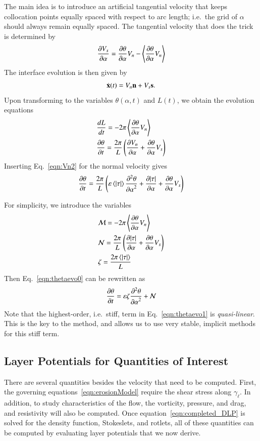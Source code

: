\documentclass[preprint, 10pt]{elsarticle}
\begin{document}
The main idea is to introduce an artificial tangential velocity that keeps collocation points equally spaced with respect to arc length; i.e.~the grid of $\alpha$ should always remain equally spaced. The tangential velocity that does the trick is determined by \cite{hou-low-she1994}
\begin{equation}
\frac{\partial V_s}{\partial \alpha} = \frac{\partial \theta}{\partial \alpha} V_n - \left< \frac{\partial \theta}{\partial \alpha} V_n \right>
\end{equation}
The interface evolution is then given by
\begin{equation}
\dot{{\mathbf{x}}}(t) = V_n {\mathbf{n}} + V_s {\mathbf{s}}.
\end{equation}
Upon transforming to the variables $\theta(\alpha,t)$ and $L(t)$, we obtain the evolution equations
\begin{align}
\label{eqn:Levo0}
& \frac{d L}{d t} = - 2 \pi \left< \frac{\partial \theta}{\partial \alpha} V_n \right> \\
\label{eqn:thetaevo0}
& \frac{\partial \theta}{\partial t} = \frac{2 \pi}{L} \left( \frac{\partial V_n}{\partial \alpha} + \frac{\partial \theta}{\partial \alpha} V_s \right)
\end{align}
Inserting Eq.~\eqref{eqn:Vn2} for the normal velocity gives
\begin{equation}
\frac{\partial \theta}{\partial t} = \frac{2\pi}{L} \left(
\varepsilon \left< \lvert \tau \rvert \right> \frac{\partial^2 \theta}{{\partial \alpha}^2} + \frac{\partial \lvert \tau \rvert}{\partial \alpha} + \frac{\partial \theta}{\partial \alpha} V_s \right)
\end{equation}

For simplicity, we introduce the variables
\begin{align}
\label{eq:M}
& \mathcal{M} = - 2 \pi \left< \frac{\partial \theta}{\partial \alpha} V_n \right> \\
\label{eq:N}
& \mathcal{N} = \frac{2 \pi}{L} \left( \frac{\partial \lvert \tau \rvert}{\partial \alpha} + \frac{\partial \theta}{\partial \alpha} V_s \right) \\
\label{eq:elfun}
& \zeta = \frac{2 \pi  \left< \lvert \tau \rvert \right>}{L}
\end{align} 
Then Eq.~\eqref{eqn:thetaevo0} can be rewritten as
\begin{equation}
\label{eqn:thetaevo1}
\frac{\partial \theta}{\partial t} = \varepsilon \zeta \frac{\partial^2 \theta}{{\partial \alpha}^2} + \mathcal{N}
\end{equation}
Note that the highest-order, i.e.~stiff, term in Eq.~\eqref{eqn:thetaevo1} is {\em quasi-linear}. This is the key to the \thL method, and allows us to use very stable, implicit methods for this stiff term. 


\subsection{Layer Potentials for Quantities of Interest}
\label{sec:qois}
There are several quantities besides the velocity that need to be
computed.  First, the governing equations~\eqref{eqn:erosionModel}
require the shear stress along $\gamma_\ell$.  In addition, to study
characteristics of the flow, the vorticity, pressure, and drag, and
resistivity will also be computed.  Once
equation~\eqref{eqn:completed_DLP} is solved for the density function,
Stokeslets, and rotlets, all of these quantities can be computed by
evaluating layer potentials that we now derive.
\end{document}
